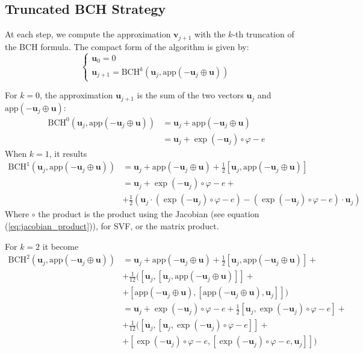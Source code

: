 \subsection{Truncated BCH Strategy}
At each step, we compute the approximation $\mathbf{v}_{j+1}$ with the $k$-th truncation of the BCH formula. The compact form of the algorithm is given by:
\begin{equation}\label{eq:bossa_bch_strat}
\begin{cases}
\mathbf{u}_0 = 0 \\
\mathbf{u}_{j+1} = \text{BCH}^{k}(\mathbf{u}_{j}, \text{app}(-\mathbf{u}_{j}  \oplus  \mathbf{u} ))
\end{cases}
\end{equation}

For $k = 0$, the approximation $\mathbf{u}_{j+1}$ is the sum of the two vectors $\mathbf{u}_{j}$ and $ \text{app}(-\mathbf{u}_{j}  \oplus  \mathbf{u} )$:
\begin{align*}
\text{BCH}^{0}(\mathbf{u}_{j}, \text{app}(-\mathbf{u}_{j}  \oplus  \mathbf{u} ))
&=
\mathbf{u}_{j} + \text{app}(-\mathbf{u}_{j}  \oplus  \mathbf{u} )\\
&=
\mathbf{u}_{j} + \exp(-\mathbf{u}_{j})\circ \varphi  - e 
\end{align*}
When $k=1$, it results 
\begin{align*}
\text{BCH}^{1}(\mathbf{u}_{j}, \text{app}(-\mathbf{u}_{j}  \oplus  \mathbf{u} ))
&=
\mathbf{u}_{j} +  \text{app}(-\mathbf{u}_{j}  \oplus  \mathbf{u} ) + \frac{1}{2}[\mathbf{u}_{j},  \text{app}(-\mathbf{u}_{j}  \oplus  \mathbf{u} )]\\
&=
\mathbf{u}_{j} + \exp(-\mathbf{u}_{j})\circ \varphi  - e + \\
&+ \frac{1}{2}(  \mathbf{u}_{j}\cdot( \exp(-\mathbf{u}_{j})\circ \varphi  - e) -  ( \exp(-\mathbf{u}_{j})\circ \varphi - e)\cdot\mathbf{u}_{j})
\end{align*}
Where $\circ $ the product is the product using the Jacobian (see equation (\ref{eq:jacobian_product})), for SVF, or the matrix product.

For $k=2$ it become
\begin{align*}
\text{BCH}^{2}(\mathbf{u}_{j}, \text{app}(-\mathbf{u}_{j}  \oplus  \mathbf{u} ))
&=
\mathbf{u}_{j} +  \text{app}(-\mathbf{u}_{j}  \oplus  \mathbf{u} ) 
+ \frac{1}{2}[\mathbf{u}_{j},  \text{app}(-\mathbf{u}_{j}  \oplus  \mathbf{u} )] + \\
&+ \frac{1}{12}\Big([\mathbf{u}_{j},  [\mathbf{u}_{j},  \text{app}(-\mathbf{u}_{j}  \oplus  \mathbf{u} )]] +\\
&+ [\text{app}(-\mathbf{u}_{j}  \oplus  \mathbf{u} ),  [\text{app}(-\mathbf{u}_{j}  \oplus  \mathbf{u} ) ,\mathbf{u}_{j}  ]] \Big)\\
&=
\mathbf{u}_{j} + \exp(-\mathbf{u}_{j})\circ \varphi  - e 
+ \frac{1}{2}[\mathbf{u}_{j},  \exp(-\mathbf{u}_{j})\circ \varphi  - e ] + \\
&+ \frac{1}{12}\Big([\mathbf{u}_{j},  [\mathbf{u}_{j},  \exp(-\mathbf{u}_{j}) \circ\varphi  - e ]]+\\
&+ [\exp(-\mathbf{u}_{j})\circ \varphi  - e ,  [\exp(-\mathbf{u}_{j}) \circ\varphi - e  ,\mathbf{u}_{j}  ]] \Big)\\
\end{align*}

